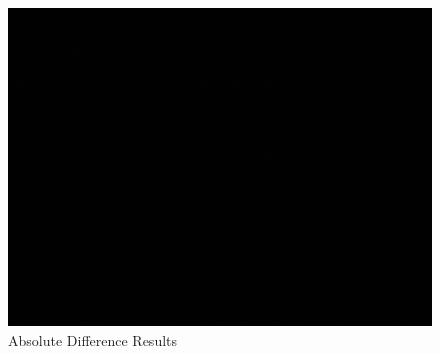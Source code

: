 		\begin{figure}[H]
			\includegraphics[width=\linewidth]{figsrc/simulation/normal/sift_absdiff.png}
			\caption{Absolute Difference Results}
			\label{fig:siftAbsDifference}
		\end{figure}


